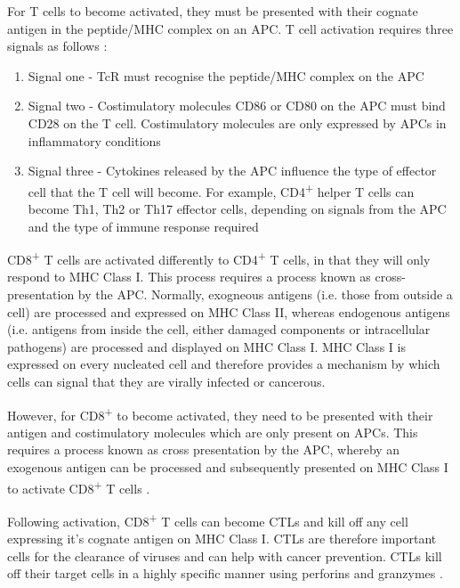 For T cells to become activated, they must be presented with their cognate antigen in the peptide/MHC complex on an APC.
T cell activation requires three signals as follows \citep{Corthay2006, Kapsenberg2003}:
\begin{enumerate}
\item Signal one - TcR must recognise the peptide/MHC complex on the APC
\item Signal two - Costimulatory molecules CD86 or CD80 on the APC must bind CD28 on the T cell. Costimulatory molecules are only expressed by APCs in inflammatory conditions
\item Signal three - Cytokines released by the APC influence the type of effector cell that the T cell will become. For example, CD4\textsuperscript{+} helper T cells can become Th1, Th2 or Th17 effector cells, depending on signals from the APC and the type of immune response required \citep{Kapsenberg2003}
\end{enumerate}

CD8\textsuperscript{+} T cells are activated differently to CD4\textsuperscript{+} T cells, in that they will only respond to MHC Class I.
This process requires a process known as cross-presentation by the APC.
Normally, exogneous antigens (i.e. those from outside a cell) are processed and expressed on MHC Class II, whereas endogenous antigens (i.e. antigens from inside the cell, either damaged components or intracellular pathogens) are processed and displayed on MHC Class I.
MHC Class I is expressed on every nucleated cell and therefore provides a mechanism by which cells can signal that they are virally infected or cancerous.

However, for CD8\textsuperscript{+} to become activated, they need to be presented with their antigen and costimulatory molecules which are only present on APCs.
This requires a process known as cross presentation by the APC, whereby an exogenous antigen can be processed and subsequently presented on MHC Class I to activate CD8\textsuperscript{+} T cells \citep{Rock2005}.

Following activation, CD8\textsuperscript{+} T cells can become CTLs and kill off any cell expressing it's cognate antigen on MHC Class I.
CTLs are therefore important cells for the clearance of viruses and can help with cancer prevention.
CTLs kill off their target cells in a highly specific manner using perforins and granzymes \citep{Janeway2001}.








